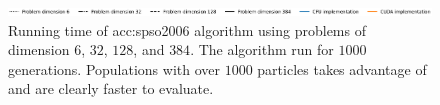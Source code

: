 \begin{figure}[ht!]
\begin{minipage}[t]{0.32\textwidth}
    \end{minipage}

    \begin{minipage}{\textwidth}
        \centering
        \includegraphics[width=\textwidth]{img/runs/time_pso2006_alldim_legend.pdf}
    \end{minipage}

    \caption[Running time of PSO2006]{Running time of \acrlong{acc:spso2006} algorithm using problems of dimension $6$, $32$, $128$, and $384$. The algorithm run for $1000$ generations. Populations with over $1000$ particles takes advantage of \gpu and are clearly faster to evaluate.}
\end{figure}

